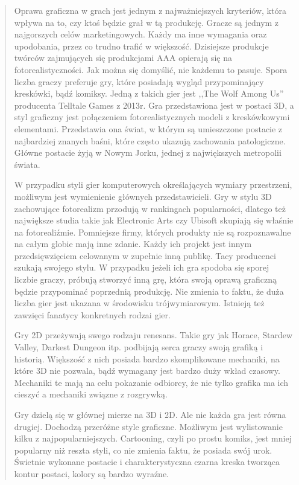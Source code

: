 \begin{quotation}
\indent Oprawa graficzna w grach jest jednym z najważniejszych kryteriów, która wpływa na to, czy ktoś będzie grał w tą produkcję. Gracze są jednym z najgorszych celów marketingowych. Każdy ma inne wymagania oraz upodobania, przez co trudno trafić w większość. Dzisiejsze produkcje twórców zajmujących się produkcjami AAA opierają się na fotorealistyczności. Jak można się domyślić, nie każdemu to pasuje. Spora liczba graczy preferuje gry, które posiadają wygląd przypominający kreskówki, bądź komiksy. Jedną z takich gier jest ,,The Wolf Among Us'' producenta Telltale Games z 2013r. Gra przedstawiona jest w postaci 3D, a styl graficzny jest połączeniem fotorealistycznych modeli z kreskówkowymi elementami. Przedstawia ona świat, w którym są umieszczone postacie z najbardziej znanych baśni, które często ukazują zachowania patologiczne. Główne postacie żyją w Nowym Jorku, jednej z największych metropolii świata.

\indent W przypadku styli gier komputerowych określających wymiary przestrzeni, możliwym jest wymienienie głównych przedstawicieli. Gry w stylu 3D zachowujące fotorealizm przodują w rankingach popularności, dlatego też największe studia takie jak Electronic Arts czy Ubisoft skupiają się właśnie na fotorealiźmie. Pomniejsze firmy, których produkty nie są rozpoznawalne na całym globie mają inne zdanie. Każdy ich projekt jest innym przedsięwzięciem celowanym w zupełnie inną publikę. Tacy producenci szukają swojego stylu. W przypadku jeżeli ich gra spodoba się sporej liczbie graczy, próbują stworzyć inną grę, która swoją oprawą graficzną będzie przypominać poprzednią produkcję. Nie zmienia to faktu, że duża liczba gier jest ukazana w środowisku trójwymiarowym. Istnieją też zawzięci fanatycy konkretnych rodzai gier.

\indent Gry 2D przeżywają swego rodzaju renesans. Takie gry jak Horace, Stardew Valley, Darkest Dungeon itp. podbijają serca graczy swoją grafiką i historią. Większość z nich posiada bardzo skomplikowane mechaniki, na które 3D nie pozwala, bądź wymagany jest bardzo duży wkład czasowy. Mechaniki te mają na celu pokazanie odbiorcy, że nie tylko grafika ma ich cieszyć a mechaniki związne z rozgrywką.

\indent Gry dzielą się w głównej mierze na 3D i 2D. Ale nie każda gra jest równa drugiej. Dochodzą przeróżne style graficzne. Możliwym jest wylistowanie kilku z najpopularniejszych. Cartooning, czyli po prostu komiks, jest mniej popularny niż reszta styli, co nie zmienia faktu, że posiada swój urok. Świetnie wykonane postacie i charakterystyczna czarna kreska tworząca kontur postaci, kolory są bardzo wyraźne.


\end{quotation}
